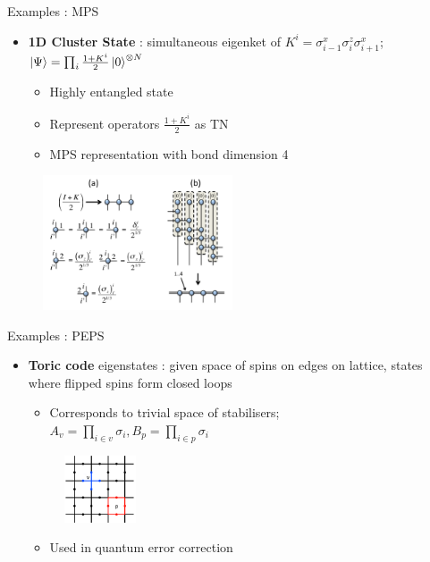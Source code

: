 \documentclass{beamer}
\begin{document}
\begin{frame}{Examples : MPS}
	\begin{itemize}
	\item \textbf{1D Cluster State} : simultaneous eigenket of ${ K^{i}=\sigma ^{x}_{i-1}\sigma ^{z}_{i}\sigma ^{x}_{i+1} }$; ${ \ket{\Psi }=\prod_i \frac{ 1+K^{i}}{2} \ket{0}^{\otimes N}}$
		\begin{itemize}
		\item Highly entangled state
		\item Represent operators ${ \frac{1+K^{i}}{2} }$ as TN
		\item MPS representation with bond dimension 4
		\end{itemize}
\end{itemize}	
\begin{figure}[h]
\includegraphics[width=0.5\textwidth]{1dcluster}
\centering
\end{figure}

\end{frame}

\begin{frame}{Examples : PEPS}
	\begin{itemize}
	\item \textbf{Toric code} eigenstates : given space of spins on edges on lattice, states where flipped spins form closed loops 
		\begin{itemize}
		\item Corresponds to trivial space of stabilisers;\\
			${ A_{v}=\prod_{i \in v} \sigma _{i}, B_{p} =\prod_{i \in p}\sigma _{i}}$
		\end{itemize}
		\begin{figure}[h]
		\includegraphics[width=0.2\textwidth]{toric}
		\centering
		\end{figure}
		\begin{itemize}
		\item Used in quantum error correction
		\end{itemize}
	\end{itemize}
\end{frame}
\end{document}
